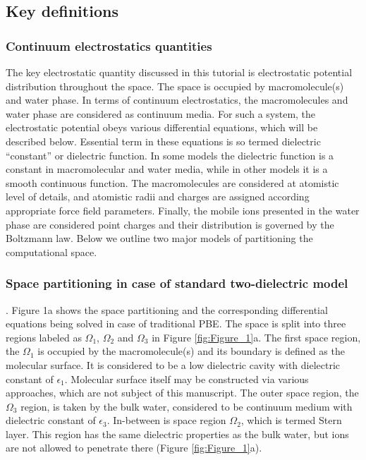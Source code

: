 \documentclass[9pt,tutorial]{livecoms}
\begin{document}
\subsection{Key definitions}

\subsubsection{Continuum electrostatics quantities} The key electrostatic quantity discussed in this tutorial is electrostatic potential distribution throughout the space. The space is occupied by macromolecule(s) and water phase. In terms of continuum electrostatics, the macromolecules and water phase are considered as continuum media. For such a system, the electrostatic potential obeys various differential equations, which will be described below. Essential term in these equations is so termed dielectric “constant” or dielectric function. In some models the dielectric function is a constant in macromolecular and water media, while in other models it is a smooth continuous function. The macromolecules are considered at atomistic level of details, and atomistic radii and charges are assigned according appropriate force field parameters. Finally, the mobile ions presented in the water phase are considered point charges and their distribution is governed by the Boltzmann law. Below we outline two major models of partitioning the computational space. 

\subsubsection{Space partitioning in case of standard two-dielectric model\cite{rocchia2002rapid,baker2001electrostatics}}. Figure 1a shows the space partitioning and the corresponding differential equations being solved in case of traditional PBE. The space is split into three regions labeled as $ \Omega_1 $, $ \Omega_2 $ and $ \Omega_3 $ in Figure \ref{fig:Figure_1}a. The first space region, the $\Omega_1$ is occupied by the macromolecule(s) and its boundary is defined as the molecular surface. It is considered to be a low dielectric cavity with dielectric constant of $\epsilon_1$. Molecular surface itself may be constructed via various approaches, which are not subject of this manuscript. The outer space region, the $\Omega_3$ region, is taken by the bulk water, considered to be continuum medium with dielectric constant of $\epsilon_3$. In-between is space region $\Omega_2$, which is termed Stern layer. This region has the same dielectric properties as the bulk water, but ions are not allowed to penetrate there (Figure \ref{fig:Figure_1}a).
\end{document}
